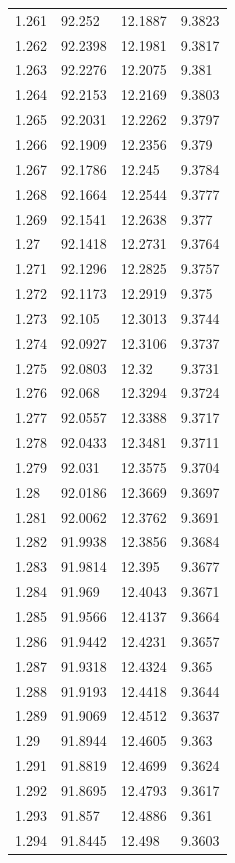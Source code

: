 \begin{tabular}{llll}
1.261 & 92.252 & 12.1887 & 9.3823 \\
1.262 & 92.2398 & 12.1981 & 9.3817 \\
1.263 & 92.2276 & 12.2075 & 9.381 \\
1.264 & 92.2153 & 12.2169 & 9.3803 \\
1.265 & 92.2031 & 12.2262 & 9.3797 \\
1.266 & 92.1909 & 12.2356 & 9.379 \\
1.267 & 92.1786 & 12.245 & 9.3784 \\
1.268 & 92.1664 & 12.2544 & 9.3777 \\
1.269 & 92.1541 & 12.2638 & 9.377 \\
1.27 & 92.1418 & 12.2731 & 9.3764 \\
1.271 & 92.1296 & 12.2825 & 9.3757 \\
1.272 & 92.1173 & 12.2919 & 9.375 \\
1.273 & 92.105 & 12.3013 & 9.3744 \\
1.274 & 92.0927 & 12.3106 & 9.3737 \\
1.275 & 92.0803 & 12.32 & 9.3731 \\
1.276 & 92.068 & 12.3294 & 9.3724 \\
1.277 & 92.0557 & 12.3388 & 9.3717 \\
1.278 & 92.0433 & 12.3481 & 9.3711 \\
1.279 & 92.031 & 12.3575 & 9.3704 \\
1.28 & 92.0186 & 12.3669 & 9.3697 \\
1.281 & 92.0062 & 12.3762 & 9.3691 \\
1.282 & 91.9938 & 12.3856 & 9.3684 \\
1.283 & 91.9814 & 12.395 & 9.3677 \\
1.284 & 91.969 & 12.4043 & 9.3671 \\
1.285 & 91.9566 & 12.4137 & 9.3664 \\
1.286 & 91.9442 & 12.4231 & 9.3657 \\
1.287 & 91.9318 & 12.4324 & 9.365 \\
1.288 & 91.9193 & 12.4418 & 9.3644 \\
1.289 & 91.9069 & 12.4512 & 9.3637 \\
1.29 & 91.8944 & 12.4605 & 9.363 \\
1.291 & 91.8819 & 12.4699 & 9.3624 \\
1.292 & 91.8695 & 12.4793 & 9.3617 \\
1.293 & 91.857 & 12.4886 & 9.361 \\
1.294 & 91.8445 & 12.498 & 9.3603 \\

\end{tabular}
